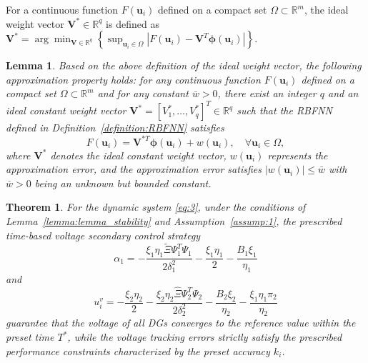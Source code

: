 \documentclass[]{interact}
\theoremstyle{plain}%
\newtheorem{theorem}{Theorem}
\newtheorem{lemma}{Lemma}
\theoremstyle{definition}
\theoremstyle{remark}
\begin{document}
For a continuous function $F(\boldsymbol{u}_i)$ defined on a compact set $\Omega \subset \mathbb{R}^m$, the ideal weight vector $\boldsymbol{V}^* \in \mathbb{R}^q$ is defined as
$\boldsymbol{V}^* =
\arg\min_{\boldsymbol{V} \in \mathbb{R}^q}
\left\{
\sup_{\boldsymbol{u}_i \in \Omega}
\left|
F(\boldsymbol{u}_i) - \boldsymbol{V}^{T} \boldsymbol{\phi}(\boldsymbol{u}_i)
\right|
\right\}$.

\begin{lemma}
\label{lemma:RBFNN}
\citep{Ssa2022,Mohamed2020} Based on the above definition of the ideal weight vector, the following approximation property holds: for any continuous function $F(\boldsymbol{u}_i)$ defined on a compact set $\Omega \subset \mathbb{R}^{m}$ and for any constant $\bar{w} > 0$, there exist an integer $q$ and an ideal constant weight vector 
$\boldsymbol{V}^{*} = [V_{1}^{*}, \dots, V_{q}^{*}]^{T} \in \mathbb{R}^{q}$ 
such that the RBFNN defined in Definition~\ref{definition:RBFNN} satisfies
\begin{equation}
F(\boldsymbol{u}_i) = \boldsymbol{V}^{*T} \boldsymbol{\phi}(\boldsymbol{u}_i) + w(\boldsymbol{u}_i), 
\quad \forall \boldsymbol{u}_i \in \Omega,
\end{equation}
where $\boldsymbol{V}^{*}$ denotes the ideal constant weight vector, 
$w(\boldsymbol{u}_i)$ represents the approximation error, 
and the approximation error satisfies $|w(\boldsymbol{u}_i)| \le \bar{w}$ with $\bar{w} > 0$ being an unknown but bounded constant.
\end{lemma}

\begin{theorem}
\label{theorem:1}
For the dynamic system \eqref{eq:3}, under the conditions of Lemma~\ref{lemma:lemma_stability} and Assumption~\ref{assump:1}, the prescribed time-based voltage secondary control strategy 
\[
\alpha_1 = -\frac{\xi_1 \eta_1 \tilde{\Xi} \boldsymbol{\varPsi}_1^T \boldsymbol{\varPsi}_1}{2 \delta_1^2} - \frac{\xi_1 \eta_1}{2} - \frac{B_1 \xi_1}{\eta_1}
\]
and
\[
u_i^v = -\frac{\xi_2\eta_{2}}{2} - \frac{\xi_2\eta_{2}\hat{\Xi}\boldsymbol{\varPsi}_{2}^{T}\boldsymbol{\varPsi}_{2}}{2\delta_{2}^{2}} - \frac{B_{2}\xi_{2}}{\eta_{2}} - \frac{\xi_{1}\eta_{1}\pi_{2}}{\eta_{2}}
\]
guarantee that the voltage of all DGs converges to the reference value within the preset time $T^{*}$, while the voltage tracking errors strictly satisfy the prescribed performance constraints characterized by the preset accuracy $k_i$.
\end{theorem}
\end{document}
